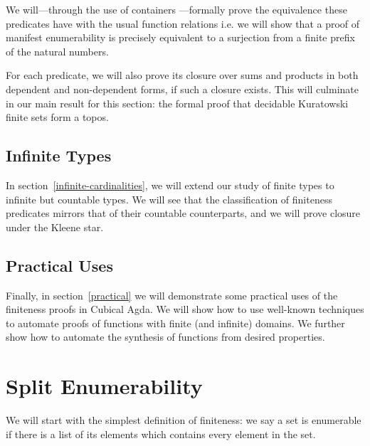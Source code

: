 We will---through the use of containers
\cite{abbottContainersConstructingStrictly2005}---formally prove the equivalence
these predicates have with the usual function relations i.e. we will show that a
proof of manifest enumerability is precisely equivalent to a surjection from a
finite prefix of the natural numbers.

For each predicate, we will also prove its closure over sums and products in
both dependent and non-dependent forms, if such a closure exists.
This will culminate in our main result for this section: the formal proof that
decidable Kuratowski finite sets form a topos.
\subsection{Infinite Types}
In section~\ref{infinite-cardinalities}, we will extend our study of finite
types to infinite but countable types.
We will see that the classification of finiteness predicates mirrors that of
their countable counterparts, and we will prove closure under the Kleene star.

\subsection{Practical Uses}
Finally, in section~\ref{practical} we will demonstrate some practical uses of
the finiteness proofs in Cubical Agda.
We will show how to use well-known techniques
\cite{firsovDependentlyTypedProgramming2015, devrieseBrightSideType2011} to
automate proofs of functions with finite (and infinite) domains.
We further show how to automate the synthesis of functions from desired
properties.
\section{Split Enumerability} \label{split-enumerable}
We will start with the simplest definition of finiteness: we say a set is
enumerable if there is a list of its elements which contains every element in
the set.

